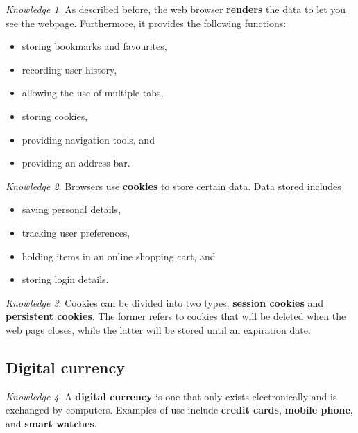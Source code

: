 \documentclass[8pt]{article}
\theoremstyle{remark}
\newtheorem{knowledge}{Knowledge}[subsection]
\begin{document}
            \begin{knowledge}
                As described before, the web browser \textbf{renders} the data to let you see the webpage. Furthermore, it provides the following functions:
                \begin{itemize}
                    \item storing bookmarks and favourites,
                    \item recording user history,
                    \item allowing the use of multiple tabs,
                    \item storing cookies,
                    \item providing navigation tools, and
                    \item providing an address bar.
                \end{itemize}
            \end{knowledge}

            \begin{knowledge}
                Browsers use \textbf{cookies} to store certain data. Data stored includes
                \begin{itemize}
                    \item saving personal details,
                    \item tracking user preferences,
                    \item holding items in an online shopping cart, and
                    \item storing login details.
                \end{itemize}
            \end{knowledge}

            \begin{knowledge}
                Cookies can be divided into two types, \textbf{session cookies} and \textbf{persistent cookies}. The former refers to cookies that will be deleted when the web page closes, while the latter will be stored until an expiration date.
            \end{knowledge}

        \subsection{Digital currency}
            \begin{knowledge}
                A \textbf{digital currency} is one that only exists electronically and is exchanged by computers. Examples of use include \textbf{credit cards}, \textbf{mobile phone}, and \textbf{smart watches}.
            \end{knowledge}
\end{document}
